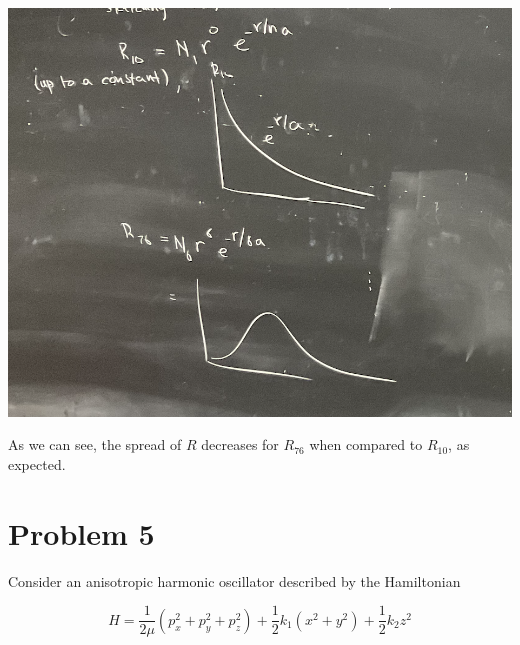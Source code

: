 \documentclass[10pt]{article}
\begin{document}
\begin{enumerate}[(a)]
\begin{solution}
            \begin{center}
                \includegraphics*[scale=0.5]{expval.png}
            \end{center}

            As we can see, the spread of $R$ decreases for $R_{76}$ when compared to $R_{10}$, as expected.
        \end{solution}
    \end{enumerate}

    \pagebreak

    \section*{Problem 5}

    Consider an anisotropic harmonic oscillator described by the Hamiltonian 

    \[ H = \frac{1}{2\mu} (p_x^2 + p_y^2 + p_z^2) + \frac 12 k_1(x^2 + y^2) + \frac 12 k_2z^2\] 
\end{document}
